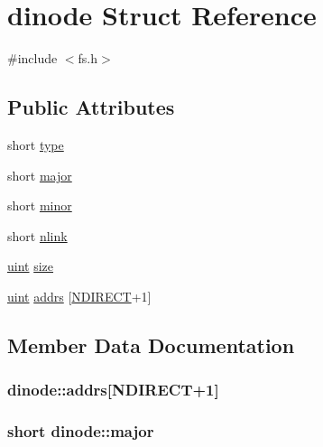 \hypertarget{structdinode}{}\section{dinode Struct Reference}
\label{structdinode}


{\ttfamily \#include $<$fs.\+h$>$}

\subsection*{Public Attributes}
\begin{DoxyCompactItemize}
\item 
short \hyperlink{structdinode_abf6b2a8476a803284f1c927fb3b82259}{type}
\item 
short \hyperlink{structdinode_aca8272002020f48219df175c986db257}{major}
\item 
short \hyperlink{structdinode_ae97965f85e7353313f85035e8fc63495}{minor}
\item 
short \hyperlink{structdinode_a105562253b461c11413c9a229ef15358}{nlink}
\item 
\hyperlink{custom__types_8h_a91ad9478d81a7aaf2593e8d9c3d06a14}{uint} \hyperlink{structdinode_a990ad8ddf5f8c051fbbe95cf550d2164}{size}
\item 
\hyperlink{custom__types_8h_a91ad9478d81a7aaf2593e8d9c3d06a14}{uint} \hyperlink{structdinode_a705729b3a39c10c0ba6927fc5e4e0563}{addrs} \mbox{[}\hyperlink{fs_8h_acd38e9532d4b3623f844b93c012a8e06}{N\+D\+I\+R\+E\+CT}+1\mbox{]}
\end{DoxyCompactItemize}


\subsection{Member Data Documentation}
\subsubsection[{\texorpdfstring{addrs}{addrs}}]{ dinode\+::addrs\mbox{[}{\bf N\+D\+I\+R\+E\+CT}+1\mbox{]}}\hypertarget{structdinode_a705729b3a39c10c0ba6927fc5e4e0563}{}\label{structdinode_a705729b3a39c10c0ba6927fc5e4e0563}
\subsubsection[{\texorpdfstring{major}{major}}]{\setlength{\rightskip}{0pt plus 5cm}short dinode\+::major}\hypertarget{structdinode_aca8272002020f48219df175c986db257}{}\label{structdinode_aca8272002020f48219df175c986db257}
